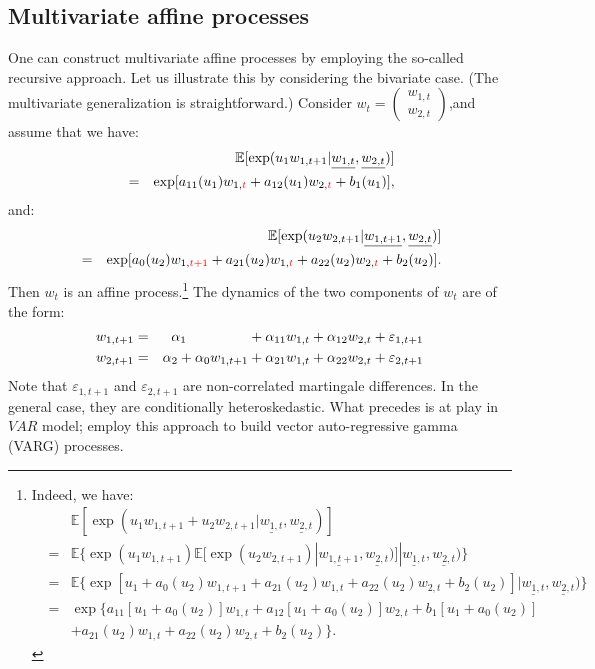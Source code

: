 \documentclass[
  12pt,
]{book}
\theoremstyle{definition}
\theoremstyle{definition}
\theoremstyle{definition}
\theoremstyle{definition}
\theoremstyle{remark}
\begin{document}
\hypertarget{buildingmulti}{%
\subsection{Multivariate affine processes}\label{buildingmulti}}

One can construct multivariate affine processes by employing the so-called recursive approach. Let us illustrate this by considering the bivariate case. (The multivariate generalization is straightforward.) Consider \(w_t = \left(\begin{array}{c} w_{1,t}\\ w_{2,t} \end{array} \right)\),and assume that we have:
\begin{eqnarray*}
&&\mathbb{E}[\exp(u_1 w_{1,t+1}|\underline{w_{1,t}}, \underline{w_{2,t}})]\\
&=& \exp[a_{11}(u_1)w_{1,{\color{red}{t}}}+a_{12}(u_1)w_{2,{\color{red}{t}}}+b_{1}(u_1)],
\end{eqnarray*}
and:
\begin{eqnarray*}
&& \mathbb{E}[\exp(u_2 w_{2,t+1}|\underline{w_{1,t+1}}, \underline{w_{2,t}})]\\
&= & \exp[a_0(u_2)w_{1,{\color{red}{t+1}}}+a_{21}(u_2)w_{1,{\color{red}{t}}}+a_{22}(u_2)w_{2,{\color{red}{t}}}+b_2(u_2)].
\end{eqnarray*}
Then \(w_t\) is an affine process.\footnote{Indeed, we have:
  \begin{eqnarray*}
  && \mathbb{E}[\exp(u_1 w_{1,t+1}+u_2 w_{2,t+1}|\underline{w_{1,t}}, \underline{w_{2,t}})]\\
  &= & \mathbb{E}\{\exp(u_1 w_{1,t+1}) \mathbb{E}[\exp(u_{2}w_{2,t+1})|\underline{w_{1,t+1}}, \underline{w_{2,t}})]|\underline{w_{1,t}}, \underline{w_{2,t}})\} \\
  &= & \mathbb{E}\{\exp[u_1+a_0(u_2)w_{1,t+1}+a_{21}(u_2)w_{1,t} + a_{22}(u_2)w_{2,t}+b_2(u_2)]|\underline{w_{1,t}}, \underline{w_{2,t}})\} \\
  &= & \exp\{a_{11}[u_1+a_0(u_2)]w_{1,t}+a_{12}[u_1+a_0(u_2)]w_{2,t}+b_1[u_1+a_0(u_2)] \\
  &&+  a_{21}(u_2)w_{1,t}+a_{22}(u_2)w_{2,t}+b_2(u_2)\}.
  \end{eqnarray*}}
The dynamics of the two components of \(w_t\) are of the form:
\begin{eqnarray*}
w_{1,t+1} &=& \alpha_1 \hspace{1.55cm} + \alpha_{11}w_{1,t} + \alpha_{12}w_{2,t} + \varepsilon_{1,t+1} \\
w_{2,t+1} &=& \alpha_2 + \alpha_{0}w_{1,t+1} + \alpha_{21}w_{1,t} + \alpha _{22} w_{2,t} + \varepsilon_{2,t+1}
\end{eqnarray*}
Note that \(\varepsilon_{1,t+1}\) and \(\varepsilon_{2,t+1}\) are non-correlated martingale differences. In the general case, they are conditionally heteroskedastic. What precedes is at play in \(VAR\) model; \citet{zarg_2017} employ this approach to build vector auto-regressive gamma (VARG) processes.
\end{document}
